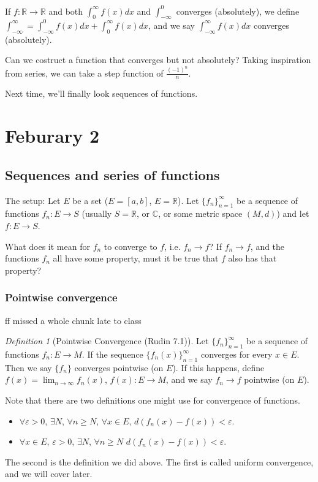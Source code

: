 \documentclass{article}
\theoremstyle{plain}
\theoremstyle{remark}
\newtheorem{definition}{Definition}
\newcommand{\R}{{\mathbb R}}
\newcommand{\C}{{\mathbb C}}
\newcommand{\ep}{{\varepsilon}}
\begin{document}
If $f \colon \R \to \R$ and both
$\int_0^\infty f(x)dx$ and $\int_{-\infty}^0$ converges (absolutely),
we define $\int_{-\infty}^\infty = \int_{-\infty}^0 f(x)dx + \int_0^\infty f(x)dx$,
and we say $\int_{-\infty}^\infty f(x)dx$ converges (absolutely).

Can we costruct a function that converges but not absolutely?
Taking inspiration from series, we can take a step function
of $\frac{(-1)^n}{n}$.

Next time, we'll finally look sequences of functions.

\section{Feburary 2}
\subsection{Sequences and series of functions}
The setup:
Let $E$ be a set ($E = [a,b]$, $ E = \R$).
Let $\{f_n\}_{n=1}^\infty$ be a sequence of functions $f_n\colon E \to S$
(usually $S = \R$, or $\C$, or some metric space $(M,d)$)
and let $f \colon E \to S$.

What does it mean for $f_n$ to converge to $f$, i.e. $f_n \to f$?
If $f_n \to f$, and the functions $f_n$ all have some property,
must it be true that $f$ also has that property?

\subsubsection{Pointwise convergence}
ff missed a whole chunk late to class

\begin{definition}[Pointwise Convergence (Rudin 7.1)]
	Let $\{f_n\}_{n=1}^\infty$ be a sequence of functions $f_n \colon E \to M$.
	If the sequence $\{f_n(x)\}_{n=1}^\infty$ converges for every $x \in E$.
	Then we say $\{f_n\}$ converges pointwise (on $E$).
	If this happens, define $f(x) = \lim_{n\to\infty}f_n(x)$, $f(x) \colon E \to M$,
	and we say $f_n \to f$ pointwise (on $E$).
\end{definition}

Note that there are two definitions one might use for convergence of functions.
\begin{itemize}
	\item $\forall \ep > 0$, $\exists N$, $\forall n \geq N$,
		$\forall x \in E$, $d(f_n(x) - f(x)) < \ep$.
	\item $\forall x \in E$, $\ep > 0$, $\exists N$, $\forall n \geq N$
		$d(f_n(x) - f(x)) < \ep$.
\end{itemize}
The second is the definition we did above.
The first is called uniform convergence, and we will cover later.
\end{document}
